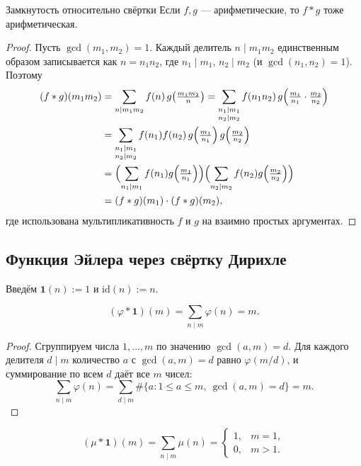 \begin{Theorem}{Замкнутость относительно свёртки}{}
	Если $f,g$ — арифметические, то $f*g$ тоже арифметическая.
\end{Theorem}

\begin{proof}
	Пусть $\gcd(m_1,m_2)=1$. Каждый делитель $n\mid m_1m_2$ единственным образом записывается как $n=n_1n_2$, где $n_1\mid m_1$, $n_2\mid m_2$ (и $\gcd(n_1,n_2)=1$). Поэтому
	\begin{align*}
		(f*g)(m_1 m_2)
		&=\sum_{n\mid m_1 m_2}f(n)\,g\!\left(\tfrac{m_1 m_2}{n}\right)
		=\sum_{\substack{n_1\mid m_1\\n_2\mid m_2}}f(n_1 n_2)\,g\!\left(\tfrac{m_1}{n_1}\cdot\tfrac{m_2}{n_2}\right)\\
		&=\sum_{\substack{n_1\mid m_1\\n_2\mid m_2}}f(n_1)f(n_2)\,g\!\left(\tfrac{m_1}{n_1}\right)g\!\left(\tfrac{m_2}{n_2}\right)\\
		&=\Bigl(\sum_{n_1\mid m_1}f(n_1)g\!\left(\tfrac{m_1}{n_1}\right)\Bigr)\Bigl(\sum_{n_2\mid m_2}f(n_2)g\!\left(\tfrac{m_2}{n_2}\right)\Bigr)\\
		&=(f*g)(m_1)\cdot(f*g)(m_2),
	\end{align*}
	где использована мультипликативность $f$ и $g$ на взаимно простых аргументах.
\end{proof}

\subsection{Функция Эйлера через свёртку Дирихле}

Введём $\mathbf 1(n):=1$ и $\mathrm{id}(n):=n$.

\begin{Statement}{}{}
	\[
	(\varphi*\mathbf 1)(m)=\sum_{n\mid m}\varphi(n)=m.
	\]
\end{Statement}

\begin{proof}
	Сгруппируем числа $1,\dots,m$ по значению $\gcd(a,m)=d$. Для каждого делителя $d\mid m$ количество $a$ с $\gcd(a,m)=d$ равно $\varphi(m/d)$, и суммирование по всем $d$ даёт все $m$ чисел:
	\[
	\sum_{n\mid m}\varphi(n)=\sum_{d\mid m}\#\{a:1\le a\le m,\ \gcd(a,m)=d\}=m.
	\]
\end{proof}

\begin{Statement}{}{}
	\[
	(\mu*\mathbf 1)(m)=\sum_{n\mid m}\mu(n)=
	\begin{cases}1,&m=1,\\0,&m>1.\end{cases}
	\]
\end{Statement}

